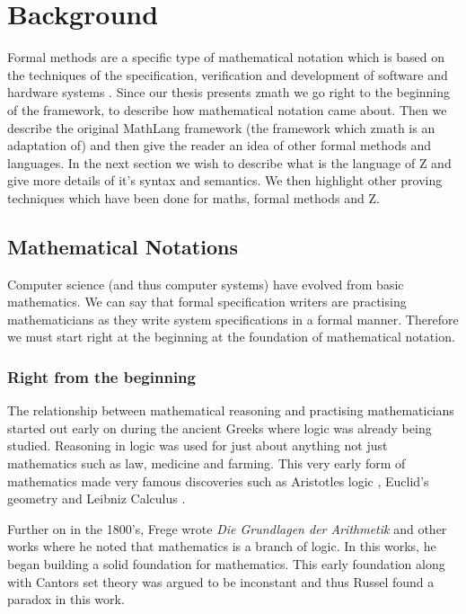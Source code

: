 \chapter{Background}
\label{ch:background}

Formal methods are a specific type of mathematical notation which is based on
the techniques of the specification, verification and development of software
and hardware systems \cite{whatareformalmethods}. Since our thesis presents
\gls{zmath} we go right to the beginning of the framework, to describe how
mathematical notation came about. Then we describe the original MathLang
framework (the framework which \gls{zmath} is an adaptation of) and then give
the reader an idea of other formal methods and languages. In the next section we
wish to describe what is the language of Z and give more details of it's syntax
and semantics. We then highlight other proving techniques which have been done
for maths, formal methods and Z.

\section{Mathematical Notations}

Computer science (and thus computer systems) have evolved from basic
mathematics. We can say that formal specification writers are practising
mathematicians as they write system specifications in a formal manner. Therefore
we must start right at the beginning at the foundation of mathematical notation.

\subsection{Right from the beginning}
\label{subsec:rftb}

The relationship between mathematical reasoning and practising mathematicians
started out early on during the ancient Greeks where logic was already being
studied. Reasoning in logic was used for just about anything not just
mathematics such as law, medicine and farming. This very early form of
mathematics made very famous discoveries such as Aristotles logic
\cite{aristotle}, Euclid's geometry \cite{euclid} and Leibniz Calculus
\cite{leibniz}.

Further on in the 1800's, Frege wrote \emph{Die Grundlagen der Arithmetik}
\cite{frege} and other works where he noted that mathematics is a branch of
logic. In this works, he began building a solid foundation for mathematics. This
early foundation along with Cantors set theory \cite{cantor} was argued to be
inconstant and thus Russel found a paradox in this work.

